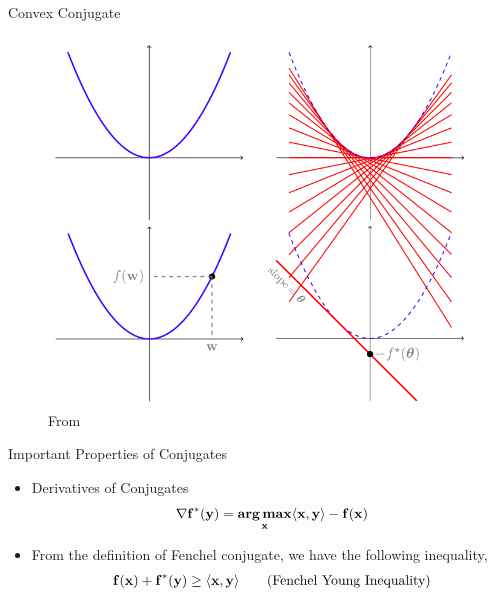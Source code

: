 \begin{frame}{Convex Conjugate}
  \begin{figure}
    \includegraphics[scale=0.27]{images/fenchel.png}
    \caption{From \cite{ShSh2012}}
  \end{figure}
\end{frame}

\begin{frame}{Important Properties of Conjugates}
  \begin{itemize} 
  \item Derivatives of Conjugates
    \begin{align*}
    \nabla \opt{\f}(\y) = \argmax_{\x}\dotprod{\x}{\y} - \f(\x)
  \end{align*}  
  \item From the definition of Fenchel conjugate, we have the following inequality,
    \begin{align*}
      \f(\x) + \opt{\f}(\y) \ge \dotprod{\x}{\y} \tag{Fenchel Young Inequality}
    \end{align*}
  \end{itemize}

\end{frame}

